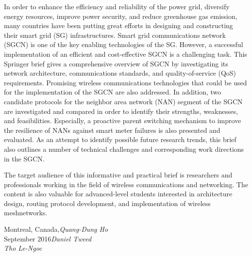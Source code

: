 %
%

\preface
In order to enhance the efficiency and reliability of the power grid, diversify energy resources, improve power security, and reduce greenhouse gas emission, many countries have been putting great efforts in designing and constructing their smart grid (SG) infrastructures. Smart grid communications network (SGCN) is one of the key enabling technologies of the SG. However, a successful implementation of an efficient and cost-effective SGCN is a challenging task. This Springer brief gives a comprehensive overview of SGCN by investigating its network architecture, communications standards, and quality-of-service (QoS) requirements. Promising wireless communications technologies that could be used for the implementation of the SGCN are also addressed. In addition, two candidate protocols for the neighbor area network (NAN) segment of the SGCN are investigated and compared in order to identify their strengths, weaknesses, and feasibilities. Especially, a proactive parent switching mechanism to improve the resilience of NANs against smart meter failures is also presented and evaluated. As an attempt to identify possible future research trends, this brief also outlines a number of technical challenges and corresponding work directions in the SGCN.

The target audience of this informative and practical brief is researchers and professionals working in the field of wireless communications and networking. The content is also valuable for advanced-level students interested in architecture design, routing protocol development, and implementation of wireless meshnetworks.

\vspace{\baselineskip}
\begin{flushright}\noindent
Montreal, Canada,\hfill {\it Quang-Dung Ho}\\
September 2016\hfill {\it Daniel Tweed}\\
\hfill {\it Tho Le-Ngoc}\\
\end{flushright}